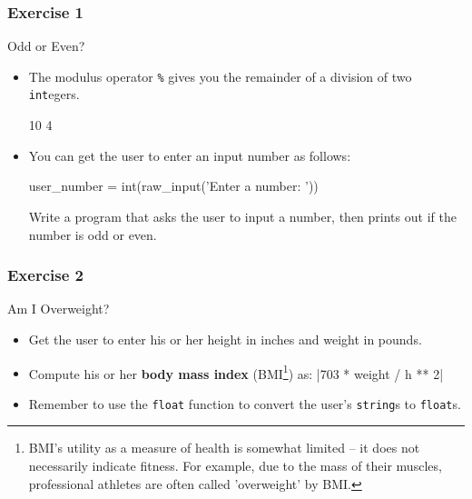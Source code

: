 \documentclass[10pt]{beamer}
\begin{document}
\begin{frame}[fragile]
  \frametitle{Exercise 1}
  \begin{block}{Odd or Even?}
    \begin{itemize}
      \item The modulus operator \texttt{\%} gives you the remainder of a division of two \texttt{int}egers.
        \begin{pythoncode}
  10 %
  4 %
        \end{pythoncode}

      \item You can get the user to enter an input number as follows:
        \begin{pythoncode}
  user_number = int(raw_input('Enter a number: '))
        \end{pythoncode}
        Write a program that asks the user to input a number, then prints out if the number is odd or even.
    \end{itemize}
  \end{block}
\end{frame}
    
\begin{frame}
  \frametitle{Exercise 2}
  \begin{block}{Am I Overweight?}
    \begin{itemize}
      \item Get the user to enter his or her height in inches and weight in pounds.
      \item Compute his or her \textbf{body mass index} (BMI\footnote{BMI's utility as a measure of health is somewhat limited -- it does not necessarily indicate fitness. For example, due to the mass of their muscles, professional athletes are often called 'overweight' by BMI.}) as: 
        |703 * weight / h ** 2|
      \item Remember to use the \texttt{float} function to convert the user's \texttt{string}s to \texttt{float}s.
    \end{itemize}
  \end{block}
\end{frame}
    
\end{document}
